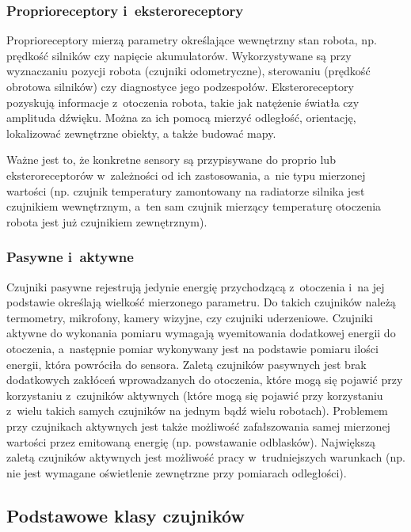 \subsubsection{Proprioreceptory i~eksteroreceptory}

Proprioreceptory mierzą parametry określające wewnętrzny stan
robota, np. prędkość silników czy napięcie akumulatorów. Wykorzystywane są
przy wyznaczaniu pozycji robota (czujniki odometryczne), sterowaniu (prędkość
obrotowa silników) czy diagnostyce jego podzespołów. Eksteroreceptory
pozyskują informacje z~otoczenia robota, takie jak natężenie
światła czy amplituda dźwięku. Można za ich pomocą mierzyć odległość,
orientację, lokalizować zewnętrzne obiekty, a także budować mapy.

Ważne jest to, że konkretne sensory są przypisywane do proprio lub
eksteroreceptorów w~zależności od ich zastosowania, a~nie typu mierzonej
wartości (np. czujnik temperatury zamontowany na radiatorze silnika jest
czujnikiem wewnętrznym, a~ten sam czujnik mierzący temperaturę otoczenia robota
jest już czujnikiem zewnętrznym).

\subsubsection{Pasywne i~aktywne}

Czujniki pasywne rejestrują jedynie energię przychodzącą z~otoczenia i~na
jej podstawie określają wielkość mierzonego parametru. Do takich czujników
należą termometry, mikrofony, kamery wizyjne, czy czujniki uderzeniowe.
Czujniki aktywne do wykonania pomiaru wymagają wyemitowania dodatkowej energii
do otoczenia, a~następnie pomiar wykonywany jest na podstawie pomiaru ilości
energii, która powróciła do sensora. Zaletą czujników pasywnych jest brak
dodatkowych zakłóceń wprowadzanych do otoczenia, które mogą się pojawić
przy korzystaniu z~czujników aktywnych (które mogą się pojawić przy korzystaniu
z~wielu takich samych czujników na jednym bądź wielu robotach). Problemem
przy czujnikach aktywnych jest także możliwość zafałszowania samej mierzonej
wartości przez emitowaną energię (np. powstawanie odblasków). Największą zaletą
czujników aktywnych jest możliwość pracy w~trudniejszych warunkach (np. nie
jest wymagane oświetlenie zewnętrzne przy pomiarach odległości).

\subsection{Podstawowe klasy czujników}

